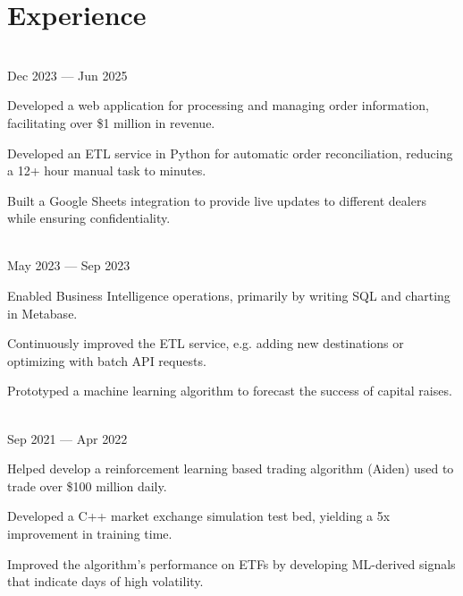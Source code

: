 \section{Experience}

 \hfill {} \\
 \hfill Dec 2023 — Jun 2025 \\ 
\begin{tightemize}
  \item Developed a web application for processing and managing order information, facilitating over \$1 million in revenue.
  \item Developed an ETL service in Python for automatic order reconciliation, reducing a 12+ hour manual task to minutes.
  \item Built a Google Sheets integration to provide live updates to different dealers while ensuring confidentiality.
\end{tightemize}
\vspace{0.2em}

 \hfill {} \\
 \hfill May 2023 — Sep 2023 \\ 
\begin{tightemize}
  \item Enabled Business Intelligence operations, primarily by writing SQL and charting in Metabase.
  \item Continuously improved the ETL service, e.g. adding new destinations or optimizing with batch API requests.
  \item Prototyped a machine learning algorithm to forecast the success of capital raises.
\end{tightemize}
\vspace{0.2em}

 \hfill {} \\
 \hfill Sep 2021 — Apr 2022 \\ 
\begin{tightemize}
  \item Helped develop a reinforcement learning based trading algorithm (Aiden) used to trade over \$100 million daily.
  \item Developed a C++ market exchange simulation test bed, yielding a 5x improvement in training time.
  \item Improved the algorithm's performance on ETFs by developing ML-derived signals that indicate days of high volatility.
\end{tightemize}
\vspace{0.2em}


